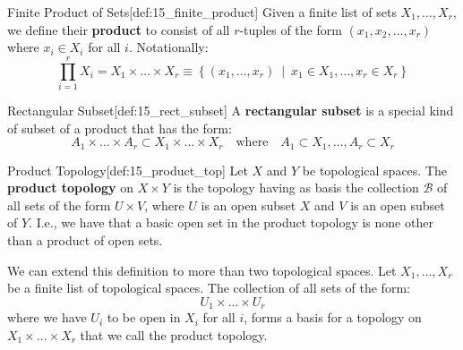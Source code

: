 \begin{defBox}{Finite Product of Sets}[def:15_finite_product]
    Given a finite list of sets \( X_{ 1 } , \ldots , X_{ r } \), we define
    their \textbf{product} to consist of all \( r \)-tuples of the form 
    \( ( x_{ 1 }, x_{ 2 }, \ldots, x_{ r } ) \) where \( x_{ i } \in X_{ i } \)
    for all \( i \). Notationally:
    \begin{equation*}
        \prod_{ i = 1 }^{ r } X_{ i }
        =
        X_{ 1 } \times \ldots \times X_{ r }
        \equiv 
        \left\{
            ( x_{ 1 } , \ldots , x_{ r } )
            \ \middle\vert \ 
            x_{ 1 } \in X_{ 1 } , \ldots , x_{ r } \in X_{ r }
        \right\}
    \end{equation*} 
\end{defBox}

\begin{defBox}{Rectangular Subset}[def:15_rect_subset]
    A \textbf{rectangular subset} is a special kind of subset of a product that 
    has the form:
    \begin{equation*}
        A_{ 1 } \times \ldots \times A_{ r } 
        \subset 
        X_{ 1 } \times \ldots \times X_{ r }
        \quad \mathrm{where} \quad 
        A_{ 1 } \subset X_{ 1 }
        , \ldots , 
        A_{ r } \subset X_{ r }
    \end{equation*}
\end{defBox}

\begin{defBox}{Product Topology}[def:15_product_top]
    Let \( X \) and \( Y \) be topological spaces.
    The \textbf{product topology} on \( X \times Y \) is the topology having as 
    basis the collection \( \mathcal{B} \) of all sets of the form \( U \times
    V \), where \( U \) is an open subset \( X \) and \( V \) is an open subset 
    of \( Y \).
    I.e., we have that a basic open set in the product topology is none other 
    than a product of open sets.

    \baseSkip
    
    We can extend this definition to more than two topological spaces.
    Let \( X_{ 1 } , \ldots , X_{ r } \) be a finite list of topological
    spaces. 
    The collection of all sets of the form: 
    \begin{equation*}
        U_{ 1 } \times \ldots \times U_{ r }
    \end{equation*}
    where we have \( U_{ i } \) to be open in \( X_{ i } \) for all \( i \),
    forms a basis for a topology on \( X_{ 1 } \times \ldots \times X_{ r } \)
    that we call the product topology.
\end{defBox}

